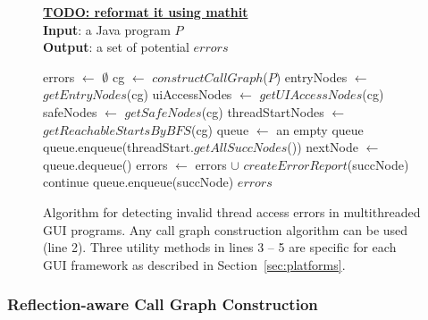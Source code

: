 \begin{figure}[t]
\textbf{\underline{TODO: reformat it using mathit}}\\
\textbf{Input}: a Java program $P$\\
\textbf{Output}: a set of potential $errors$\\
\vspace{-5mm}
\begin{algorithmic}[1]
\STATE errors $\leftarrow$ $\emptyset$
\STATE cg $\leftarrow$ $constructCallGraph$($P$)
\STATE entryNodes $\leftarrow$ $getEntryNodes$(cg)
\STATE uiAccessNodes $\leftarrow$ $getUIAccessNodes$(cg)
\STATE safeNodes $\leftarrow$ $getSafeNodes$(cg)
\STATE threadStartNodes $\leftarrow$ $getReachableStartsByBFS$(cg)
\STATE queue $\leftarrow$ an empty queue
\STATE queue.enqueue(threadStart.$getAllSuccNodes$())
\STATE nextNode $\leftarrow$ queue.dequeue()
\STATE errors $\leftarrow$ errors $\cup$ $createErrorReport$(succNode)
\STATE continue
\ELSE
\STATE queue.enqueue(succNode)
\ENDIF 
\ENDFOR
\ENDWHILE
\ENDFOR
\ENDFOR
\RETURN $errors$
\vspace{-2mm}
\end{algorithmic}
\caption{Algorithm for detecting invalid thread access errors in multithreaded GUI programs. 
Any call graph construction algorithm can be used (line 2).
Three utility methods in lines 3 -- 5 are specific for each GUI framework
 as described in Section~\ref{sec:platforms}.
} \label{fig:detectalgorithm}
\end{figure}


\subsubsection{Reflection-aware Call Graph Construction}
\label{sec:cg}

% 

